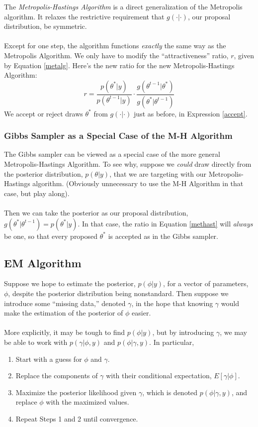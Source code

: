 \documentclass[12pt]{article}
\theoremstyle{plain}
\theoremstyle{definition}
\theoremstyle{remark}
\begin{document}
The \emph{Metropolis-Hastings Algorithm} is a direct generalization
of the Metropolis algorithm. It relaxes the restrictive
requirement that $g(\cdot|\cdot)$, our proposal distribution, be
symmetric.
\\
\\
Except for one step, the algorithm functions \emph{exactly} the same
way as the Metropolis Algorithm. We only have to modify the
``attractiveness'' ratio, $r$, given by Equation \ref{metalg}. Here's
the new ratio for the new Metropolis-Hastings Algorithm:
\begin{equation}
   \label{methast}
   r = \frac{ p(\theta^* | y) }{p(\theta^{t-1} | y)} \cdot
   \frac{ g(\theta^{t-1} | \theta^*)}{ g(\theta^* | \theta^{t-1})}
\end{equation}
We accept or reject draws $\theta^*$ from $g(\cdot | \cdot)$
just as before, in Expression \ref{accept}.

\subsubsection{Gibbs Sampler as a Special Case of the M-H
   Algorithm}
The Gibbs sampler can be viewed as a special case of the more general
Metropolis-Hastings Algorithm. To see why,
suppose we \emph{could} draw directly from the posterior distribution,
$p(\theta | y)$, that we are targeting with our Metropolis-Hastings
algorithm. (Obviously unnecessary to use the M-H Algorithm in that case,
but play along).
\\
\\
Then we can take the posterior as our proposal distribution,
$g(\theta^*| \theta^{t-1}) = p(\theta^*| y)$. In that case, the
ratio in Equation \ref{methast} will \emph{always} be one, so that
every proposed $\theta^*$ is accepted as in the Gibbs sampler.

\newpage
\subsection{EM Algorithm}

Suppose we hope to estimate the posterior, $p(\phi|y)$, for
a vector of parameters, $\phi$,
despite the posterior distribution being nonstandard. Then suppose
we introduce some ``missing data,'' denoted $\gamma$, in the hope that
knowing $\gamma$ would make the estimation of the posterior of
$\phi$ easier.
\\
\\
More explicitly, it may be tough to find $p(\phi|y)$, but by introducing
$\gamma$, we may be able to work with $p(\gamma|\phi,y)$ and
$p(\phi|\gamma,y)$. In particular,
\begin{enumerate}
   \item Start with a guess for $\phi$ and $\gamma$.
   \item Replace the components of $\gamma$ with
      their conditional expectation, $E[\gamma | \phi]$.
   \item Maximize the posterior
      likelihood given $\gamma$, which is denoted $p(\phi|\gamma,y)$,
      and replace $\phi$ with the maximized values.
   \item Repeat Steps 1 and 2 until convergence.
\end{enumerate}
\end{document}
